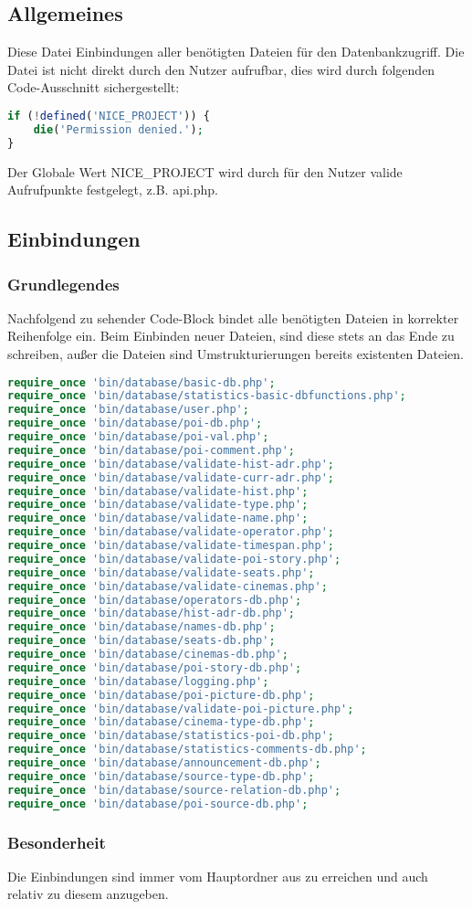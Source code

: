 \subsection{Allgemeines} Diese Datei Einbindungen aller benötigten Dateien für den Datenbankzugriff.
Die Datei ist nicht direkt durch den Nutzer aufrufbar, dies wird durch folgenden Code-Ausschnitt sichergestellt:
\begin{lstlisting}[language=php]
if (!defined('NICE_PROJECT')) {
	die('Permission denied.');
}
\end{lstlisting}
Der Globale Wert {\glqq NICE\_PROJECT\grqq} wird durch für den Nutzer valide Aufrufpunkte festgelegt, z.B. {\glqq api.php\grqq}.
\newpage
\subsection{Einbindungen}
\subsubsection{Grundlegendes}
Nachfolgend zu sehender Code-Block bindet alle benötigten Dateien in korrekter Reihenfolge ein. Beim Einbinden neuer Dateien, sind diese stets an das Ende zu schreiben, außer die Dateien sind Umstrukturierungen bereits existenten Dateien.
\begin{lstlisting}[language=php]
require_once 'bin/database/basic-db.php';
require_once 'bin/database/statistics-basic-dbfunctions.php';
require_once 'bin/database/user.php';
require_once 'bin/database/poi-db.php';
require_once 'bin/database/poi-val.php';
require_once 'bin/database/poi-comment.php';
require_once 'bin/database/validate-hist-adr.php';
require_once 'bin/database/validate-curr-adr.php';
require_once 'bin/database/validate-hist.php';
require_once 'bin/database/validate-type.php';
require_once 'bin/database/validate-name.php';
require_once 'bin/database/validate-operator.php';
require_once 'bin/database/validate-timespan.php';
require_once 'bin/database/validate-poi-story.php';
require_once 'bin/database/validate-seats.php';
require_once 'bin/database/validate-cinemas.php';
require_once 'bin/database/operators-db.php';
require_once 'bin/database/hist-adr-db.php';
require_once 'bin/database/names-db.php';
require_once 'bin/database/seats-db.php';
require_once 'bin/database/cinemas-db.php';
require_once 'bin/database/poi-story-db.php';
require_once 'bin/database/logging.php';
require_once 'bin/database/poi-picture-db.php';
require_once 'bin/database/validate-poi-picture.php';
require_once 'bin/database/cinema-type-db.php';
require_once 'bin/database/statistics-poi-db.php';
require_once 'bin/database/statistics-comments-db.php';
require_once 'bin/database/announcement-db.php';
require_once 'bin/database/source-type-db.php';
require_once 'bin/database/source-relation-db.php';
require_once 'bin/database/poi-source-db.php';
\end{lstlisting}
\subsubsection{Besonderheit}
Die Einbindungen sind immer vom Hauptordner aus zu erreichen und auch relativ zu diesem anzugeben.